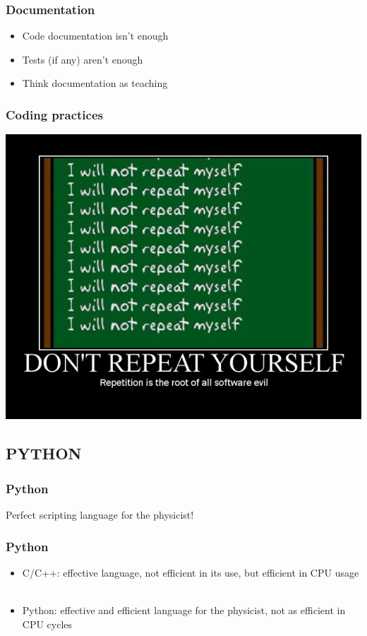 \documentclass[14pt]{beamer}
\begin{document}
\begin{frame}
\frametitle{Documentation}
\begin{itemize}
\item Code documentation isn't enough
\item Tests (if any) aren't enough
\item Think documentation as teaching
\end{itemize}
\end{frame}

\begin{frame}
\frametitle{Coding practices}
\centering
\includegraphics[width=\textwidth]{dontrepeatyourself_motivator_2}

\end{frame}

\subsection{PYTHON}
\begin{frame}
\frametitle{Python}
Perfect scripting language for the physicist!
\end{frame}


\begin{frame}
\frametitle{Python}
\begin{itemize}
\item C/C++: effective language, not efficient in its use, but efficient in CPU usage\\~
\item Python: effective and efficient language for the physicist, not as efficient in CPU cycles
\end{itemize}
\end{frame}
\end{document}
